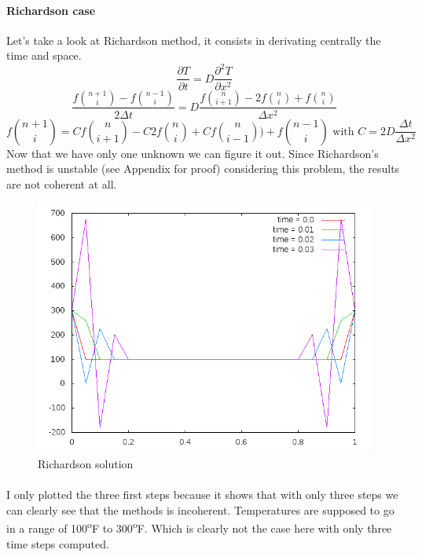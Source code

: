 \documentclass[12pt, a4paper]{report}
\begin{document}
\paragraph{Richardson case}
Let's take a look at Richardson method, it consists in derivating centrally the time and space.
\begin{equation}\frac{\partial T}{\partial t} = D\frac{\partial^2T }{\partial x^2}
\end{equation} 
\begin{equation}\frac{f\binom{n+1}{i} - f\binom{n-1}{i}}{2\Delta t} = D\frac{f\binom{n}{i+1} - 2f\binom{n}{i}+ f\binom{n}{i}}{\Delta x^{2}}
\end{equation} 
\begin{equation}f\binom{n+1}{i} = Cf\binom{n}{i+1} - C2f\binom{n}{i}+ Cf\binom{n}{i-1})+f\binom{n-1}{i} \text{ with }
C = 2D\frac{\Delta t}{\Delta x^{2}}
\end{equation} 
Now that we have only one unknown we can figure it out. Since Richardson's method is unstable (see Appendix for proof) considering this problem, the results are not coherent at all.\\
\begin{figure}[h]
\centering
\includegraphics[scale=0.6]{Richardson.png}
\caption{Richardson solution}
\end{figure}
\paragraph{}
I only plotted the three first steps because it shows that with only three steps we can clearly see that the methods is incoherent. Temperatures are supposed to go in a range of 100\textsuperscript{o}F to 300\textsuperscript{o}F. Which is clearly not the case here with only three time steps computed.
\end{document}
